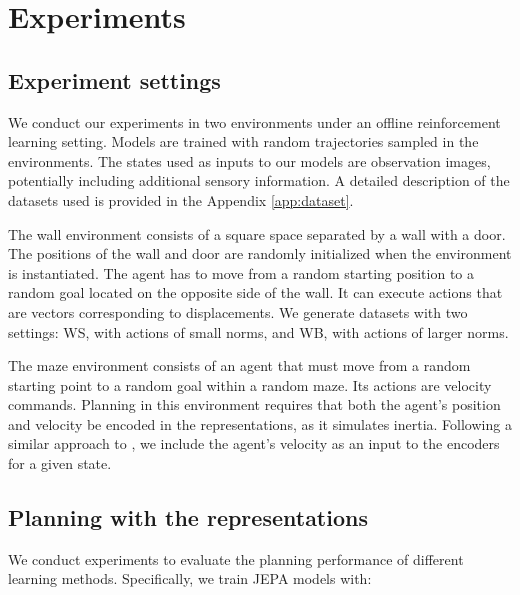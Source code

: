 \section{Experiments}

\subsection{Experiment settings}

We conduct our experiments in two environments under an offline reinforcement learning setting. Models are trained with random trajectories sampled in the environments. The states used as inputs to our models are observation images, potentially including additional sensory information. A detailed description of the datasets used is provided in the Appendix \ref{app:dataset}.

The wall environment consists of a square space separated by a wall with a door. The positions of the wall and door are randomly initialized when the environment is instantiated. The agent has to move from a random starting position to a random goal located on the opposite side of the wall. It can execute actions that are vectors corresponding to displacements. We generate datasets with two settings: WS, with actions of small norms, and WB, with actions of larger norms.

The maze environment consists of an agent that must move from a random starting point to a random goal within a random maze. Its actions are velocity commands. Planning in this environment requires that both the agent's position and velocity be encoded in the representations, as it simulates inertia. Following a similar approach to \cite{sobal2025learningrewardfreeofflinedata}, we include the agent's velocity as an input to the encoders for a given state.



\subsection{Planning with the representations}
We conduct experiments to evaluate the planning performance of different learning methods. Specifically, we train JEPA models with:


